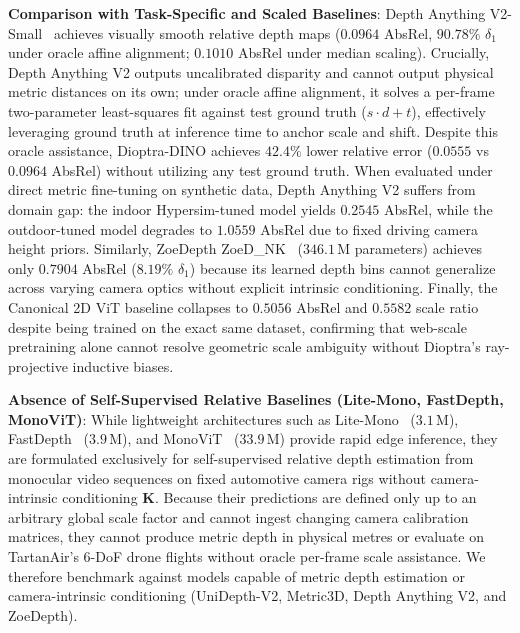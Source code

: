 \noindent\textbf{Comparison with Task-Specific and Scaled Baselines}:
Depth Anything V2-Small~\cite{yang2024depth2} achieves visually smooth relative depth maps ($0.0964$ AbsRel, $90.78\%$ $\delta_1$ under oracle affine alignment; $0.1010$ AbsRel under median scaling). Crucially, Depth Anything V2 outputs uncalibrated disparity and cannot output physical metric distances on its own; under oracle affine alignment, it solves a per-frame two-parameter least-squares fit against test ground truth ($s \cdot d + t$), effectively leveraging ground truth at inference time to anchor scale and shift. Despite this oracle assistance, Dioptra-DINO achieves $42.4\%$ lower relative error ($0.0555$ vs $0.0964$ AbsRel) without utilizing any test ground truth. When evaluated under direct metric fine-tuning on synthetic data, Depth Anything V2 suffers from domain gap: the indoor Hypersim-tuned model yields $0.2545$ AbsRel, while the outdoor-tuned model degrades to $1.0559$ AbsRel due to fixed driving camera height priors. Similarly, ZoeDepth ZoeD\_NK~\cite{bhat2023zoedepth} ($346.1$\,M parameters) achieves only $0.7904$ AbsRel ($8.19\%$ $\delta_1$) because its learned depth bins cannot generalize across varying camera optics without explicit intrinsic conditioning. Finally, the Canonical 2D ViT baseline collapses to $0.5056$ AbsRel and $0.5582$ scale ratio despite being trained on the exact same dataset, confirming that web-scale pretraining alone cannot resolve geometric scale ambiguity without Dioptra's ray-projective inductive biases.

\noindent\textbf{Absence of Self-Supervised Relative Baselines (Lite-Mono, FastDepth, MonoViT)}:
While lightweight architectures such as Lite-Mono~\cite{zhang2023litemono} ($3.1$\,M), FastDepth~\cite{wofk2019fastdepth} ($3.9$\,M), and MonoViT~\cite{zhao2022monovit} ($33.9$\,M) provide rapid edge inference, they are formulated exclusively for self-supervised relative depth estimation from monocular video sequences on fixed automotive camera rigs without camera-intrinsic conditioning $\mathbf{K}$. Because their predictions are defined only up to an arbitrary global scale factor and cannot ingest changing camera calibration matrices, they cannot produce metric depth in physical metres or evaluate on TartanAir's 6-DoF drone flights without oracle per-frame scale assistance. We therefore benchmark against models capable of metric depth estimation or camera-intrinsic conditioning (UniDepth-V2, Metric3D, Depth Anything V2, and ZoeDepth).

